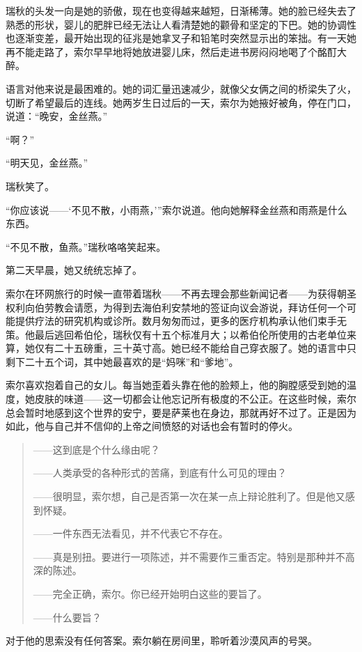 \documentclass[AutoFakeBold=true]{book}
\begin{document}
瑞秋的头发一向是她的骄傲，现在也变得越来越短，日渐稀薄。她的脸已经失去了熟悉的形状，婴儿的肥胖已经无法让人看清楚她的颧骨和坚定的下巴。她的协调性也逐渐变差，最开始出现的征兆是她拿叉子和铅笔时突然显示出的笨拙。有一天她再不能走路了，索尔早早地将她放进婴儿床，然后走进书房闷闷地喝了个酩酊大醉。

语言对他来说是最困难的。她的词汇量迅速减少，就像父女俩之间的桥梁失了火，切断了希望最后的连线。她两岁生日过后的一天，索尔为她掖好被角，停在门口，说道：``晚安，金丝燕。''

``啊？''

``明天见，金丝燕。''

瑞秋笑了。

``你应该说——`不见不散，小雨燕，'''索尔说道。他向她解释金丝燕和雨燕是什么东西。

``不见不散，鱼燕。''瑞秋咯咯笑起来。

第二天早晨，她又统统忘掉了。

\vspace*{1em}

索尔在环网旅行的时候一直带着瑞秋——不再去理会那些新闻记者——为获得朝圣权利向伯劳教会请愿，为得到去海伯利安禁地的签证向议会游说，拜访任何一个可能提供疗法的研究机构或诊所。数月匆匆而过，更多的医疗机构承认他们束手无策。他最后逃回希伯伦，瑞秋仅有十五个标准月大；以希伯伦所使用的古老单位来算，她仅有二十五磅重，三十英寸高。她已经不能给自己穿衣服了。她的语言中只剩下二十五个词，其中她最喜欢的是``妈咪''和``爹地''。

索尔喜欢抱着自己的女儿。每当她歪着头靠在他的脸颊上，他的胸膛感受到她的温度，她皮肤的味道——这一切都会让他忘记所有极度的不公正。在这些时候，索尔总会暂时地感到这个世界的安宁，要是萨莱也在身边，那就再好不过了。正是因为如此，他与自己并不信仰的上帝之间愤怒的对话也会有暂时的停火。

\begin{quotation}
	——这到底是个什么缘由呢？

	{\kaishu ——人类承受的各种形式的苦痛，到底有什么可见的理由？}

	——很明显，索尔想，自己是否第一次在某一点上辩论胜利了。但是他又感到怀疑。

	{\kaishu ——一件东西无法看见，并不代表它不存在。}

	——真是别扭。要进行一项陈述，并不需要作三重否定。特别是那种并不高深的陈述。

	{\kaishu ——完全正确，索尔。你已经开始明白这些的要旨了。}

	——什么要旨？
\end{quotation}

对于他的思索没有任何答案。索尔躺在房间里，聆听着沙漠风声的号哭。
\end{document}
